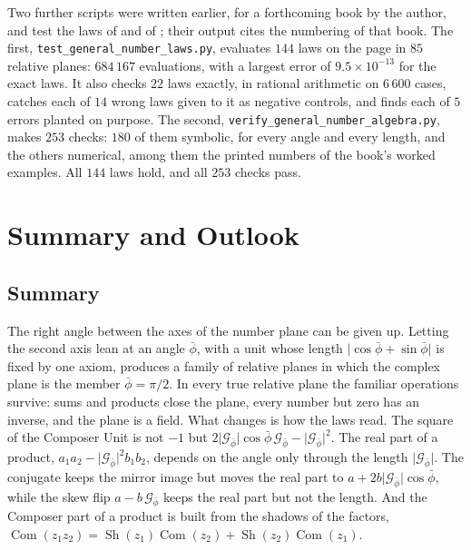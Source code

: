 \documentclass[11pt,a4paper]{amsart}
\theoremstyle{plain}
\theoremstyle{definition}
\theoremstyle{remark}
\newcommand{\pb}{\bar{\phi}}                     %
\newcommand{\Gp}{\mathcal{G}_{\bar{\phi}}}       %
\DeclareMathOperator{\Com}{Com}                  %
\DeclareMathOperator{\Sh}{Sh}                    %
\begin{document}
Two further scripts were written earlier, for a forthcoming book by the author, and test the laws of  and of ; their output cites the numbering of that book. The first, \texttt{test\_general\_number\_laws.py}, evaluates $144$ laws on the page in $85$ relative planes: $684\,167$ evaluations, with a largest error of $9.5 \times 10^{-13}$ for the exact laws. It also checks $22$ laws exactly, in rational arithmetic on $6\,600$ cases, catches each of $14$ wrong laws given to it as negative controls, and finds each of $5$ errors planted on purpose. The second, \texttt{verify\_general\_number\_algebra.py}, makes $253$ checks: $180$ of them symbolic, for every angle and every length, and the others numerical, among them the printed numbers of the book's worked examples. All $144$ laws hold, and all $253$ checks pass.

\section{Summary and Outlook}\label{sec:summary}

\subsection{Summary}

The right angle between the axes of the number plane can be given up. Letting the second axis lean at an angle $\pb$, with a unit whose length $\lvert\cos\pb + \sin\pb\rvert$ is fixed by one axiom, produces a family of relative planes in which the complex plane is the member $\pb = \pi/2$. In every true relative plane the familiar operations survive: sums and products close the plane, every number but zero has an inverse, and the plane is a field. What changes is how the laws read. The square of the Composer Unit is not $-1$ but $2\lvert\Gp\rvert\cos\pb\,\Gp - \lvert\Gp\rvert^2$. The real part of a product, $a_1a_2 - \lvert\Gp\rvert^2b_1b_2$, depends on the angle only through the length $\lvert\Gp\rvert$. The conjugate keeps the mirror image but moves the real part to $a + 2b\lvert\Gp\rvert\cos\pb$, while the skew flip $a - b\,\Gp$ keeps the real part but not the length. And the Composer part of a product is built from the shadows of the factors, $\Com(z_1z_2) = \Sh(z_1)\Com(z_2) + \Sh(z_2)\Com(z_1)$.
\end{document}
